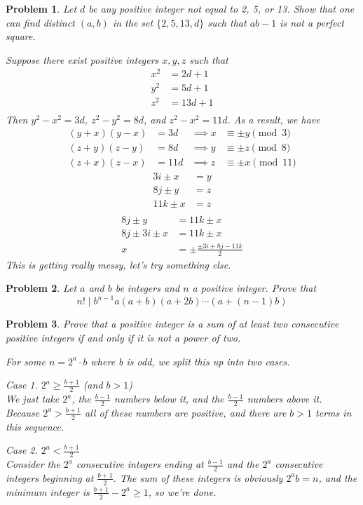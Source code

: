 \documentclass{scrartcl}
\newtheorem{a_problem}{Problem}
\begin{document}
\begin{a_problem}
Let $d$ be any positive integer not equal to 2, 5, or 13. Show that one can find distinct $(a,b)$ in the set $\{2,5,13,d\}$ such that $ab-1$ is not a perfect square.
	\begin{soln}
		Suppose there exist positive integers $x,y,z$ such that
		\begin{align*}
			x^2 &= 2d+1 \\
			y^2 &= 5d+1 \\
			z^2 &= 13d+1 \\
		\end{align*}
		Then $y^2-x^2 = 3d$, $z^2 - y^2 = 8d$, and $z^2 - x^2 = 11d$.
		As a result, we have
		\begin{align*}
			(y+x)(y-x) &= 3d  &\implies x &\equiv \pm y \pmod{3} \\
			(z+y)(z-y) &= 8d  &\implies y &\equiv \pm z \pmod{8} \\
			(z+x)(z-x) &= 11d &\implies z &\equiv \pm x \pmod{11}
		\end{align*}
		\begin{align*}
			3i \pm x &= y \\
			8j \pm y &= z \\
			11k \pm x &= z \\
		\end{align*}
		\begin{align*}
			8j \pm y &= 11k \pm x \\
			8j \pm 3i \pm x &= 11k \pm x \\
			x &= \pm\frac{\pm3i + 8j - 11k}{2}
		\end{align*}
		This is getting really messy, let's try something else.
			
	\end{soln}
\end{a_problem}

\begin{a_problem}
	Let $a$ and $b$ be integers and $n$ a positive integer. Prove that 
	\[n! \mid b^{n-1}a(a+b)(a+2b)\cdots(a+(n-1)b)\]
\end{a_problem}

\begin{a_problem}
	Prove that a positive integer is a sum of at least two consecutive positive integers if and only if it is not a power of two.
	\begin{soln}
		For some $n=2^a \cdot b$ where b is odd, we split this up into two cases.

		Case 1. $2^a \geq \frac{b+1}{2} $ (and $b > 1$) \\
		We just take $2^a$, the $\frac{b-1}{2}$ numbers below it, and the $\frac{b-1}{2}$ numbers above it. Because $2^a > \frac{b+1}{2}$ all of these numbers are positive, and there are $b > 1$ terms in this sequence.

		Case 2. $2^a < \frac{b+1}{2} $ \\
		Consider the $2^a$ consecutive integers ending at $\frac{b-1}{2}$ and the $2^a$ consecutive integers beginning at $\frac{b+1}{2}$. The sum of these integers is obviously $2^ab = n$, and the minimum integer is $\frac{b+1}{2} - 2^a \geq 1$, so we're done.
	\end{soln}
\end{a_problem}
\end{document}
